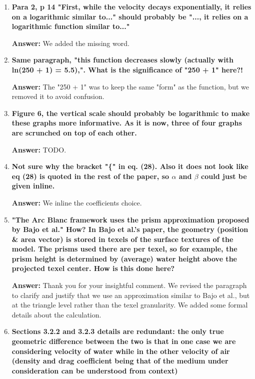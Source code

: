\documentclass{article}
\newcommand{\answer}[1]{\textbf{\textcolor{answercolor}{Answer:}} \textcolor{answercolor}{#1}}
\begin{document}
\begin{enumerate}[label=\textbf{\arabic*.}]
	\item \textbf{Para 2, p 14 "First, while the velocity decays exponentially, it relies on a logarithmic similar to..." should probably be "..., it relies on a logarithmic function similar to..."}

	      \answer{We added the missing word.}

	\item \textbf{Same paragraph, "this function decreases slowly (actually with ln(250 + 1) = 5.5),". What is the significance of "250 + 1" here?!}

	      \answer{The "250 + 1" was to keep the same "form" as the function, but we removed it to avoid confusion.}

	\item \textbf{Figure 6, the vertical scale should probably be logarithmic to make these graphs more informative. As it is now, three of four graphs are scrunched on top of each other.}

	      \answer{TODO.}

	\item \textbf{Not sure why the bracket "\{" in eq. (28). Also it does not look like eq (28) is quoted in the rest of the paper, so $\alpha$ and $\beta$ could just be given inline.}

	      \answer{We inline the coefficients choice.}

	\item \textbf{"The Arc Blanc framework uses the prism approximation proposed by Bajo et al." How? In Bajo et al.’s paper, the geometry (position \& area vector) is stored in texels of the surface textures of the model. The prisms used there are per texel, so for example, the prism height is determined by (average) water height above the projected texel center. How is this done here?}

	      \answer{Thank you for your insightful comment. We revised the paragraph to clarify and justify that we use an approximation similar to Bajo et al., but at the triangle level rather than the texel granularity. We added some formal details about the calculation.}

	\item \textbf{Sections 3.2.2 and 3.2.3 details are redundant: the only true geometric difference between the two is that in one case we are considering velocity of water while in the other velocity of air (density and drag coefficient being that of the medium under consideration can be understood from context)}


\end{enumerate}
\end{document}
